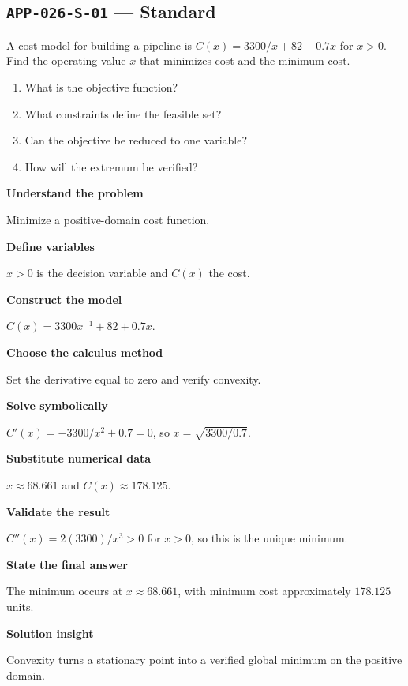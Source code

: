 \documentclass[11pt]{book}
\newcommand{\pid}[1]{\texttt{#1}}
\begin{document}
\subsection*{\pid{APP-026-S-01} — Standard}
\begin{problembox}
A cost model for building a pipeline is $C(x)=3300/x+82+0.7x$ for $x>0$. Find the operating value $x$ that minimizes cost and the minimum cost.
\end{problembox}
\begin{promptbox}\begin{enumerate}
\item What is the objective function?
\item What constraints define the feasible set?
\item Can the objective be reduced to one variable?
\item How will the extremum be verified?
\end{enumerate}\end{promptbox}
\begin{solutionbox}
\textbf{Understand the problem}\par Minimize a positive-domain cost function.\par\medskip
\textbf{Define variables}\par $x>0$ is the decision variable and $C(x)$ the cost.\par\medskip
\textbf{Construct the model}\par $C(x)=3300x^{-1}+82+0.7x$.\par\medskip
\textbf{Choose the calculus method}\par Set the derivative equal to zero and verify convexity.\par\medskip
\textbf{Solve symbolically}\par $C'(x)=-3300/x^2+0.7=0$, so $x=\sqrt{3300/0.7}$.\par\medskip
\textbf{Substitute numerical data}\par $x\approx 68.661$ and $C(x)\approx 178.125$.\par\medskip
\textbf{Validate the result}\par $C''(x)=2(3300)/x^3>0$ for $x>0$, so this is the unique minimum.\par\medskip
\textbf{State the final answer}\par The minimum occurs at $x\approx 68.661$, with minimum cost approximately $178.125$ units.\par\medskip
\textbf{Solution insight}\par Convexity turns a stationary point into a verified global minimum on the positive domain.\par\medskip
\end{solutionbox}
\end{document}
